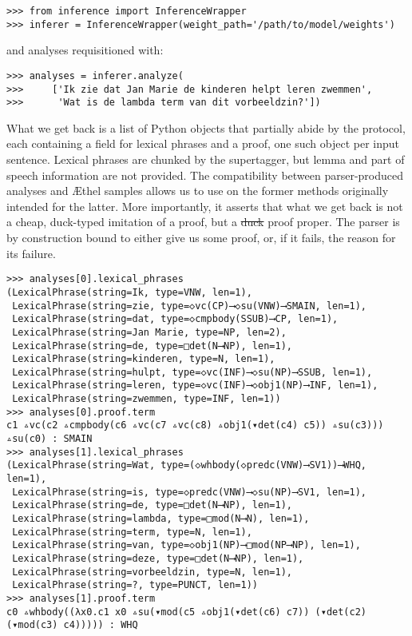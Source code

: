 \begin{verbatim}
>>> from inference import InferenceWrapper
>>> inferer = InferenceWrapper(weight_path='/path/to/model/weights')
\end{verbatim}

\noindent and analyses requisitioned with:
\begin{verbatim}
>>> analyses = inferer.analyze(
>>>     ['Ik zie dat Jan Marie de kinderen helpt leren zwemmen',
>>>      'Wat is de lambda term van dit vorbeeldzin?'])
\end{verbatim}

\noindent What we get back is a list of Python objects that partially abide by the  protocol, each containing a field for lexical phrases and a proof, one such object per input sentence.
Lexical phrases are chunked by the supertagger, but lemma and part of speech information are not provided.
The compatibility between parser-produced analyses and \AE thel samples allows us to use on the former methods originally intended for the latter.
More importantly, it asserts that what we get back is not a cheap, duck-typed imitation of a proof, but a \sout{duck} proof proper. 
The parser is by construction bound to either give us some proof, or, if it fails, the reason for its failure. 

\begin{verbatim}
>>> analyses[0].lexical_phrases
(LexicalPhrase(string=Ik, type=VNW, len=1),
 LexicalPhrase(string=zie, type=◇vc(CP)⟶◇su(VNW)⟶SMAIN, len=1),
 LexicalPhrase(string=dat, type=◇cmpbody(SSUB)⟶CP, len=1),
 LexicalPhrase(string=Jan Marie, type=NP, len=2),
 LexicalPhrase(string=de, type=□det(N⟶NP), len=1),
 LexicalPhrase(string=kinderen, type=N, len=1),
 LexicalPhrase(string=hulpt, type=◇vc(INF)⟶◇su(NP)⟶SSUB, len=1),
 LexicalPhrase(string=leren, type=◇vc(INF)⟶◇obj1(NP)⟶INF, len=1),
 LexicalPhrase(string=zwemmen, type=INF, len=1))
>>> analyses[0].proof.term
c1 ▵vc(c2 ▵cmpbody(c6 ▵vc(c7 ▵vc(c8) ▵obj1(▾det(c4) c5)) ▵su(c3))) ▵su(c0) : SMAIN
>>> analyses[1].lexical_phrases
(LexicalPhrase(string=Wat, type=(◇whbody(◇predc(VNW)⟶SV1))⟶WHQ, len=1),
 LexicalPhrase(string=is, type=◇predc(VNW)⟶◇su(NP)⟶SV1, len=1),
 LexicalPhrase(string=de, type=□det(N⟶NP), len=1),
 LexicalPhrase(string=lambda, type=□mod(N⟶N), len=1),
 LexicalPhrase(string=term, type=N, len=1),
 LexicalPhrase(string=van, type=◇obj1(NP)⟶□mod(NP⟶NP), len=1),
 LexicalPhrase(string=deze, type=□det(N⟶NP), len=1),
 LexicalPhrase(string=vorbeeldzin, type=N, len=1),
 LexicalPhrase(string=?, type=PUNCT, len=1))
>>> analyses[1].proof.term
c0 ▵whbody((λx0.c1 x0 ▵su(▾mod(c5 ▵obj1(▾det(c6) c7)) (▾det(c2) (▾mod(c3) c4))))) : WHQ
\end{verbatim}

